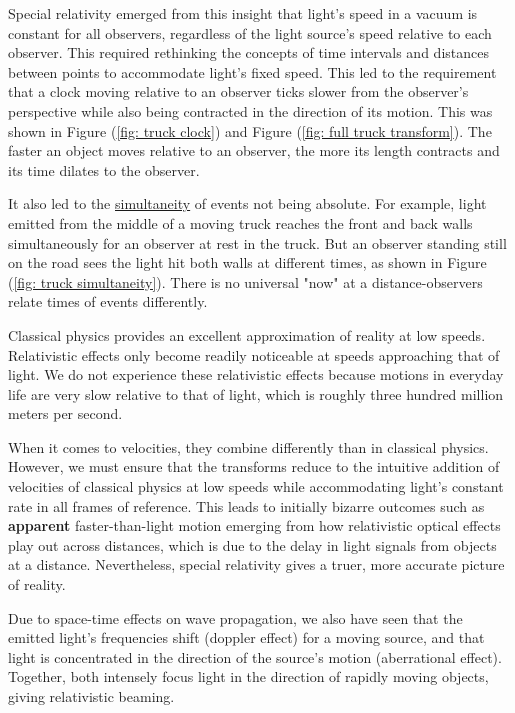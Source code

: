 Special relativity emerged from this insight that light's speed in a vacuum is constant for all observers, regardless of the light source's speed relative to each observer.
This required rethinking the concepts of time intervals and distances between points to accommodate light's fixed speed.
This led to the requirement that a clock moving relative to an observer ticks slower from the observer's perspective while also being contracted in the direction of its motion.
This was shown in Figure (\ref{fig: truck clock}) and Figure (\ref{fig: full truck transform}).
The faster an object moves relative to an observer, the more its length contracts and its time dilates to the observer.

It also led to the \hyperlink{def-simultaneity}{simultaneity} of events not being absolute.
For example, light emitted from the middle of a moving truck reaches the front and back walls simultaneously for an observer at rest in the truck.
But an observer standing still on the road sees the light hit both walls at different times, as shown in Figure (\ref{fig: truck simultaneity}).
There is no universal "now" at a distance-observers relate times of events differently.

Classical physics provides an excellent approximation of reality at low speeds.
Relativistic effects only become readily noticeable at speeds approaching that of light.
We do not experience these relativistic effects because motions in everyday life are very slow relative to that of light, which is roughly three hundred million meters per second.

When it comes to velocities, they combine differently than in classical physics.
However, we must ensure that the transforms reduce to the intuitive addition of velocities of classical physics at low speeds while accommodating light's constant rate in all frames of reference.
This leads to initially bizarre outcomes such as \textbf{apparent} faster-than-light motion emerging from how relativistic optical effects play out across distances, which is due to the delay in light signals from objects at a distance.
Nevertheless, special relativity gives a truer, more accurate picture of reality.

Due to space-time effects on wave propagation, we also have seen that the emitted light's frequencies shift (doppler effect) for a moving source, and that light is concentrated in the direction of the source's motion (aberrational effect).
Together, both intensely focus light in the direction of rapidly moving objects, giving relativistic beaming.

